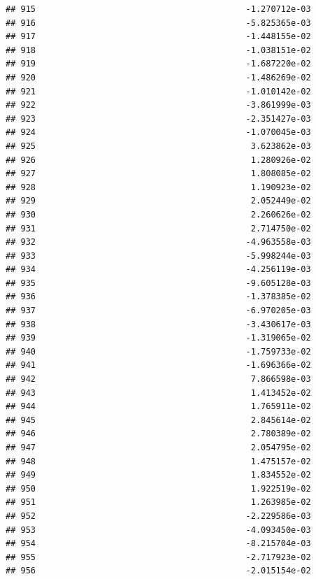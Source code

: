 \documentclass[
]{article}
\begin{document}
\begin{verbatim}
## 915                                          -1.270712e-03
## 916                                          -5.825365e-03
## 917                                          -1.448155e-02
## 918                                          -1.038151e-02
## 919                                          -1.687220e-02
## 920                                          -1.486269e-02
## 921                                          -1.010142e-02
## 922                                          -3.861999e-03
## 923                                          -2.351427e-03
## 924                                          -1.070045e-03
## 925                                           3.623862e-03
## 926                                           1.280926e-02
## 927                                           1.808085e-02
## 928                                           1.190923e-02
## 929                                           2.052449e-02
## 930                                           2.260626e-02
## 931                                           2.714750e-02
## 932                                          -4.963558e-03
## 933                                          -5.998244e-03
## 934                                          -4.256119e-03
## 935                                          -9.605128e-03
## 936                                          -1.378385e-02
## 937                                          -6.970205e-03
## 938                                          -3.430617e-03
## 939                                          -1.319065e-02
## 940                                          -1.759733e-02
## 941                                          -1.696366e-02
## 942                                           7.866598e-03
## 943                                           1.413452e-02
## 944                                           1.765911e-02
## 945                                           2.845614e-02
## 946                                           2.780389e-02
## 947                                           2.054795e-02
## 948                                           1.475157e-02
## 949                                           1.834552e-02
## 950                                           1.922519e-02
## 951                                           1.263985e-02
## 952                                          -2.229586e-03
## 953                                          -4.093450e-03
## 954                                          -8.215704e-03
## 955                                          -2.717923e-02
## 956                                          -2.015154e-02

\end{verbatim}
\end{document}
